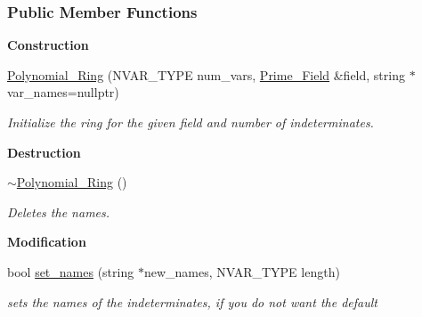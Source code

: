 \subsubsection*{Public Member Functions}
\begin{Indent}\textbf{ Construction}\par
\begin{DoxyCompactItemize}
\item 
\hyperlink{group__polygroup_af62688669a31cb720bb1e90a724daa4f}{Polynomial\+\_\+\+Ring} (N\+V\+A\+R\+\_\+\+T\+Y\+PE num\+\_\+vars, \hyperlink{group___fields_group_class_prime___field}{Prime\+\_\+\+Field} \&field, string $\ast$var\+\_\+names=nullptr)
\begin{DoxyCompactList}\small\item\em Initialize the ring for the given field and number of indeterminates. \end{DoxyCompactList}\end{DoxyCompactItemize}
\end{Indent}
\begin{Indent}\textbf{ Destruction}\par
\begin{DoxyCompactItemize}
\item 
\mbox{\label{group__polygroup_ac4952692f32f57ccd3a7e68e20cb3662}} 
\hyperlink{group__polygroup_ac4952692f32f57ccd3a7e68e20cb3662}{$\sim$\+Polynomial\+\_\+\+Ring} ()
\begin{DoxyCompactList}\small\item\em Deletes the names. \end{DoxyCompactList}\end{DoxyCompactItemize}
\end{Indent}
\begin{Indent}\textbf{ Modification}\par
\begin{DoxyCompactItemize}
\item 
bool \hyperlink{group__polygroup_ae59dcd21a16ffccc7b32e3c2f898b6f3}{set\+\_\+names} (string $\ast$new\+\_\+names, N\+V\+A\+R\+\_\+\+T\+Y\+PE length)
\begin{DoxyCompactList}\small\item\em sets the names of the indeterminates, if you do not want the default \end{DoxyCompactList}\end{DoxyCompactItemize}
\end{Indent}
